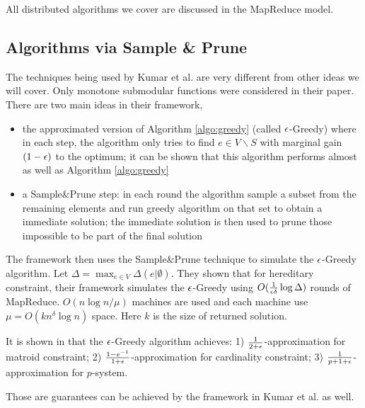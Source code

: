 All distributed algorithms we cover are discussed in the MapReduce model.

\subsection{Algorithms via Sample \& Prune}
The techniques being used by Kumar et al. \cite{KMV+15} are very different from other ideas we will cover. Only monotone submodular functions were considered in their paper. There are two main ideas in their framework,
\begin{itemize}
\item the approximated version of Algorithm \ref{algo:greedy} (called {\sc $\epsilon$-Greedy}) where in each step, the algorithm only tries to find $e\in V\backslash S$ with marginal gain $(1 - \epsilon)$ to the optimum; it can be shown that this algorithm performs almost as well as Algorithm \ref{algo:greedy}
\item a Sample\&Prune step: in each round the algorithm sample a subset from the remaining elements and run greedy algorithm on that set to obtain a immediate solution;  the immediate solution is then used to prune those impossible to be part of the final solution
\end{itemize}

The framework then uses the Sample\&Prune technique to simulate the {\sc $\epsilon$-Greedy} algorithm. Let $\Delta = \max_{e\in V} \Delta(e|\emptyset)$. They shown that for hereditary constraint, their framework simulates the {\sc $\epsilon$-Greedy} using $O(\frac{1}{\epsilon \delta}\log \Delta)$ rounds of MapReduce. $O(n\log n / \mu)$ machines are used and each machine use $\mu = O(k n^{\delta}\log n)$ space. Here $k$ is the size of returned solution.

It is shown in \cite{CCP+11} that the {\sc $\epsilon$-Greedy} algorithm achieves: 1)  $\frac{1}{2+\epsilon}$-approximation for matroid constraint; 2) $\frac{1 - e^{-1}}{1 + \epsilon}$-approximation for cardinality constraint; 3) $\frac{1}{p + 1 + \epsilon}$-approximation for $p$-system.

Those are guarantees can be achieved by the framework in Kumar et al. \cite{KMV+15} as well.



